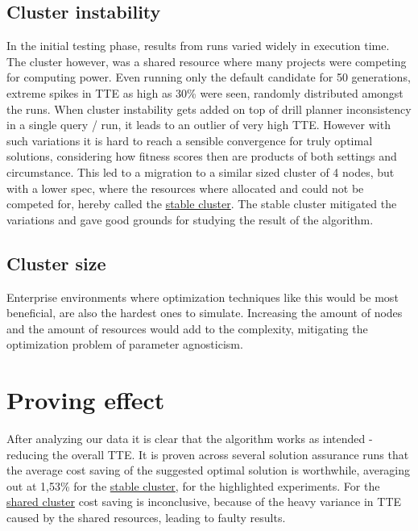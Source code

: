 \documentclass[a4paper,english]{report}
\begin{document}
		\subsection{Cluster instability}
		In the initial testing phase, results from runs varied widely in execution time. The cluster however, was a shared resource where many projects were competing for computing power. Even running only the default candidate for 50 generations, extreme spikes in TTE as high as 30\% were seen, randomly distributed amongst the runs. When cluster instability gets added on top of drill planner inconsistency in a single query / run, it leads to an outlier of very high TTE. However with such variations it is hard to reach a sensible convergence for truly optimal solutions, considering how fitness scores then are products of both settings and circumstance. This led to a migration to a similar sized cluster of 4 nodes, but with a lower spec, where the resources where allocated and could not be competed for, hereby called the \hyperref[table:cluster_stable]{stable cluster}. The stable cluster mitigated the variations and gave good grounds for studying the result of the algorithm. 
		\subsection{Cluster size}
		Enterprise environments where optimization techniques like this would be most beneficial, are also the hardest ones to simulate. Increasing the amount of nodes and the amount of resources would add to the complexity, mitigating the optimization problem of parameter agnosticism. 
	\section{Proving effect}
	 After analyzing our data it is clear that the algorithm works as intended - reducing the overall TTE. It is proven across several solution assurance runs that the average cost saving of the suggested optimal solution is worthwhile, averaging out at 1,53\% for the \hyperref[table:cluster_stable]{stable cluster}, for the highlighted experiments. For the \hyperref[table:cluster_shared]{shared cluster} cost saving is inconclusive, because of the heavy variance in TTE caused by the shared resources, leading to faulty results.
\end{document}
